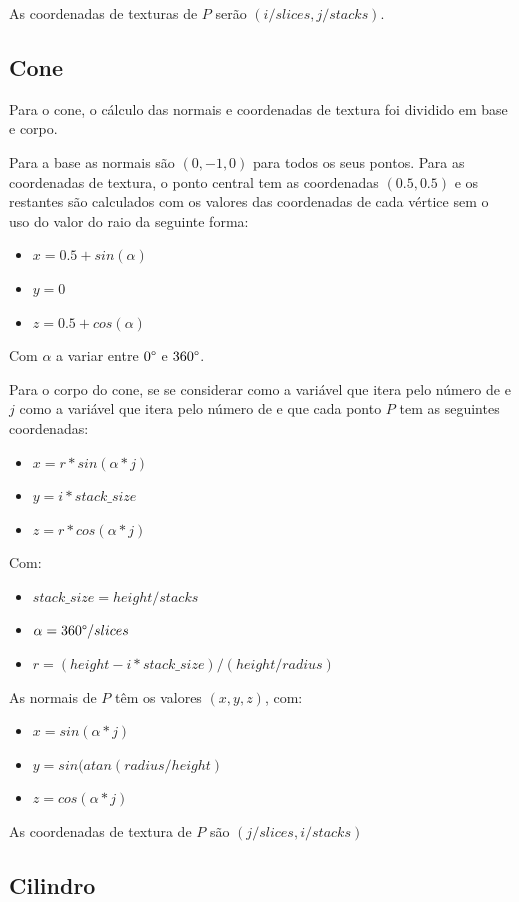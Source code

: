 \documentclass[11pt,a4paper]{report}
\begin{document}
As coordenadas de texturas de $P$ serão $(i/slices, j/stacks)$. 

\subsection{Cone}
Para o cone, o cálculo das normais e coordenadas de textura foi dividido em base e corpo.

Para a base as normais são $(0,-1,0)$ para todos os seus pontos. Para as coordenadas de textura, o ponto central tem as coordenadas $(0.5,0.5)$ e os restantes são calculados com os valores das coordenadas de cada vértice sem o uso do valor do raio da seguinte forma:
\begin{itemize}
    \item $x = 0.5 + sin(\alpha)$
    \item $y = 0$
    \item $z = 0.5 + cos(\alpha)$
\end{itemize}
Com $\alpha$  a variar entre $0 \text{\textdegree}$ e $360 \text{\textdegree}$.

Para o corpo do cone, se se considerar  como a variável que itera pelo número de  e $j$ como a variável que itera pelo número de  e que cada ponto $P$ tem as seguintes coordenadas:
\begin{itemize}
    \item $x = r*sin(\alpha*j)$
    \item $y = i*stack\_size$
    \item $z = r*cos(\alpha*j)$
\end{itemize}
Com:
\begin{itemize}
    \item $stack\_size =  height/stacks$
    \item $\alpha = 360 \text{\textdegree}/slices$
    \item $r = (height - i*stack\_size)/(height/radius)$
\end{itemize} 
As normais de $P$ têm os valores $(x,y,z)$, com:
\begin{itemize}
    \item $x = sin(\alpha*j)$
    \item $y = sin(atan(radius/height)$
    \item $z = cos(\alpha*j)$
\end{itemize}

As coordenadas de textura de $P$ são $(j/slices, i/stacks)$

\subsection{Cilindro}
\end{document}
